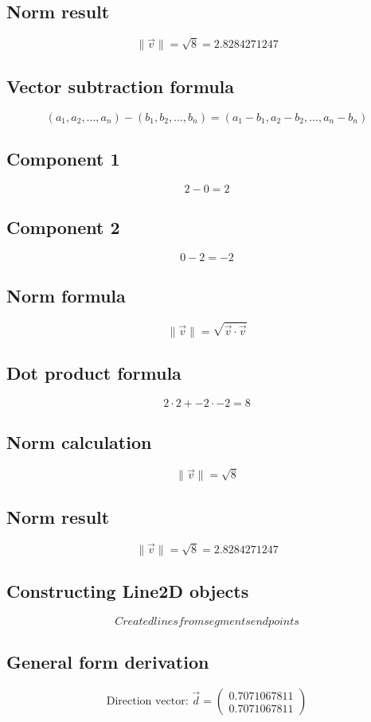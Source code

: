 \documentclass{article}
\begin{document}
\subsection*{ \vspace{1em} Norm result}
\[
\|\vec{v}\| = \sqrt{8} = 2.8284271247
\]
\subsection*{ \vspace{1em} Vector subtraction formula}
\[
(a_1, a_2, \dots, a_n) - (b_1, b_2, \dots, b_n) = (a_1 - b_1, a_2 - b_2, \dots, a_n - b_n)
\]
\subsection*{ \vspace{1em} Component 1}
\[
2 - 0 = 2
\]
\subsection*{ \vspace{1em} Component 2}
\[
0 - 2 = -2
\]
\subsection*{ \vspace{1em} Norm formula}
\[
\|\vec{v}\| = \sqrt{\vec{v} \cdot \vec{v}}
\]
\subsection*{ \vspace{1em} Dot product formula}
\[
2 \cdot 2 + -2 \cdot -2 = 8
\]
\subsection*{ \vspace{1em} Norm calculation}
\[
\|\vec{v}\| = \sqrt{8}
\]
\subsection*{ \vspace{1em} Norm result}
\[
\|\vec{v}\| = \sqrt{8} = 2.8284271247
\]
\subsection*{ \vspace{1em} Constructing Line2D objects}
\[
Created lines from segments endpoints
\]
\subsection*{ \vspace{1em} General form derivation}
\[
\text{Direction vector: } \vec{d} = \begin{pmatrix}0.7071067811 \\ 0.7071067811\end{pmatrix}
\]
\end{document}

